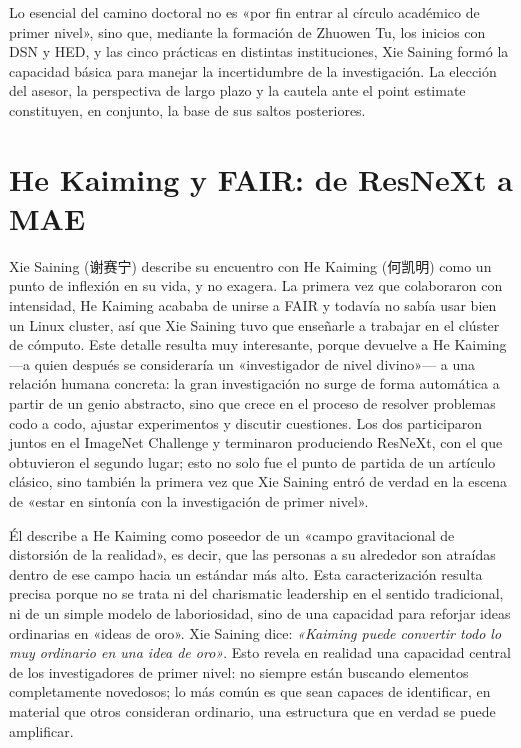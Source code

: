 \documentclass[a4paper,12pt]{article}
\begin{document}
Lo esencial del camino doctoral no es «por fin entrar al círculo académico de primer nivel», sino que, mediante la formación de Zhuowen Tu, los inicios con DSN y HED, y las cinco prácticas en distintas instituciones, Xie Saining formó la capacidad básica para manejar la incertidumbre de la investigación. La elección del asesor, la perspectiva de largo plazo y la cautela ante el point estimate constituyen, en conjunto, la base de sus saltos posteriores.
\section{He Kaiming y FAIR: de ResNeXt a MAE}

Xie Saining (谢赛宁) describe su encuentro con He Kaiming (何凯明) como un punto de inflexión en su vida, y no exagera. La primera vez que colaboraron con intensidad, He Kaiming acababa de unirse a FAIR y todavía no sabía usar bien un Linux cluster, así que Xie Saining tuvo que enseñarle a trabajar en el clúster de cómputo. Este detalle resulta muy interesante, porque devuelve a He Kaiming —a quien después se consideraría un «investigador de nivel divino»— a una relación humana concreta: la gran investigación no surge de forma automática a partir de un genio abstracto, sino que crece en el proceso de resolver problemas codo a codo, ajustar experimentos y discutir cuestiones. Los dos participaron juntos en el ImageNet Challenge y terminaron produciendo ResNeXt, con el que obtuvieron el segundo lugar; esto no solo fue el punto de partida de un artículo clásico, sino también la primera vez que Xie Saining entró de verdad en la escena de «estar en sintonía con la investigación de primer nivel».

Él describe a He Kaiming como poseedor de un «campo gravitacional de distorsión de la realidad», es decir, que las personas a su alrededor son atraídas dentro de ese campo hacia un estándar más alto. Esta caracterización resulta precisa porque no se trata ni del charismatic leadership en el sentido tradicional, ni de un simple modelo de laboriosidad, sino de una capacidad para reforjar ideas ordinarias en «ideas de oro». Xie Saining dice: \textit{«Kaiming puede convertir todo lo muy ordinario en una idea de oro»}. Esto revela en realidad una capacidad central de los investigadores de primer nivel: no siempre están buscando elementos completamente novedosos; lo más común es que sean capaces de identificar, en material que otros consideran ordinario, una estructura que en verdad se puede amplificar.
\end{document}
